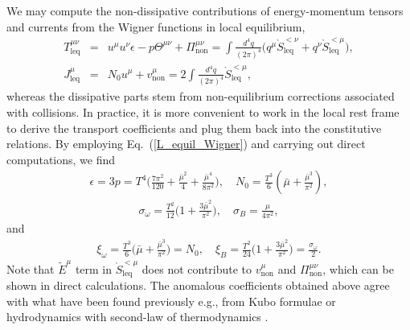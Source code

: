 \documentclass[aps,prd,showkeys,preprint,amsmath,amssymb,nofootinbib]{revtex4-1}
\begin{document}
We may compute the non-dissipative contributions of energy-momentum tensors and currents from the Wigner functions in local equilibrium,
\begin{eqnarray}\nonumber
T_{\text{leq}}^{\mu\nu}&=&u^{\mu}u^{\nu}\epsilon-p\Theta^{\mu\nu}+\Pi_\text{non}^{\mu\nu}=\int \frac{d^4q}{(2\pi)^4}\big(q^{\mu}\grave{S}^{<\nu}_{\text{leq}}+q^{\nu}\grave{S}^{<\mu}_{\text{leq}}\big),
\\
J_{\text{leq}}^{\mu}&=&N_0u^{\mu}+v_\text{non}^{\mu}=2\int \frac{d^4q}{(2\pi)^4}\grave{S}_{\text{leq}}^{<\mu},
\end{eqnarray}
whereas the dissipative parts stem from non-equilibrium corrections associated with collisions.
In practice, it is more convenient to work in the local rest frame to derive the transport coefficients and plug them back into the constitutive relations. By employing Eq.~(\ref{L_equil_Wigner}) and carrying out direct computations, we find 
\begin{eqnarray}\label{coefficients1}
\epsilon=3p=T^4\Big(\frac{7\pi^2}{120}+\frac{\bar{\mu}^2}{4}+\frac{\bar{\mu}^4}{8\pi^2}\Big),
\quad N_0=\frac{T^3}{6}\left(\bar{\mu}+\frac{\bar{\mu}^3}{\pi^2}\right),
\end{eqnarray}
\begin{eqnarray}
\sigma_{\omega}=\frac{T^2}{12}\Bigg(1+\frac{3\bar{\mu}^2}{\pi^2}\Bigg)
,\quad \sigma_B=\frac{\mu}{4\pi^2},
\end{eqnarray}
and
\begin{eqnarray}
\xi_{\omega}=\frac{T^3}{6}\Big(\bar{\mu}+\frac{\bar{\mu}^3}{\pi^2}\Big)=N_0,\quad \xi_B=\frac{ T^2}{24}\Big(1+\frac{3\bar{\mu}^2}{\pi^2}\Big)=\frac{\sigma_{\omega}}{2}.
\end{eqnarray}
Note that $\tilde{E}^{\mu}$ term in $\grave{S}^{<\mu}_{\text{leq}}$ does not contribute to $v^{\mu}_\text{non}$ and $\Pi^{\mu\nu}_\text{non}$, which can be shown in direct calculations. The anomalous coefficients obtained above agree with what have been found previously e.g., from Kubo formulae \cite{Landsteiner:2012kd} or hydrodynamics with second-law of thermodynamics \cite{Neiman:2010zi}.  
\end{document}
